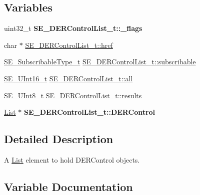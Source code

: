 \subsection*{Variables}
\begin{DoxyCompactItemize}
\item 
\mbox{\label{group__DERControlList_ga94515ccf4a77078fed1626de123ec5b2}} 
uint32\+\_\+t {\bfseries S\+E\+\_\+\+D\+E\+R\+Control\+List\+\_\+t\+::\+\_\+flags}
\item 
char $\ast$ \hyperlink{group__DERControlList_ga8ae02ab34efcdc073153919ae8ab74f5}{S\+E\+\_\+\+D\+E\+R\+Control\+List\+\_\+t\+::href}
\item 
\hyperlink{group__SubscribableType_ga5c41f553d369710ed34619266bf2551e}{S\+E\+\_\+\+Subscribable\+Type\+\_\+t} \hyperlink{group__DERControlList_ga870a4642c096dbebeffa0037894b9b41}{S\+E\+\_\+\+D\+E\+R\+Control\+List\+\_\+t\+::subscribable}
\item 
\hyperlink{group__UInt16_gac68d541f189538bfd30cfaa712d20d29}{S\+E\+\_\+\+U\+Int16\+\_\+t} \hyperlink{group__DERControlList_ga8f6118a4748b4550bf653a93d1586688}{S\+E\+\_\+\+D\+E\+R\+Control\+List\+\_\+t\+::all}
\item 
\hyperlink{group__UInt8_gaf7c365a1acfe204e3a67c16ed44572f5}{S\+E\+\_\+\+U\+Int8\+\_\+t} \hyperlink{group__DERControlList_gafeb66f551894913e0d3916884e8d506a}{S\+E\+\_\+\+D\+E\+R\+Control\+List\+\_\+t\+::results}
\item 
\mbox{\label{group__DERControlList_gaaf940c67b00730a46e3e03daf01d59ae}} 
\hyperlink{structList}{List} $\ast$ {\bfseries S\+E\+\_\+\+D\+E\+R\+Control\+List\+\_\+t\+::\+D\+E\+R\+Control}
\end{DoxyCompactItemize}


\subsection{Detailed Description}
A \hyperlink{structList}{List} element to hold D\+E\+R\+Control objects. 

\subsection{Variable Documentation}
\mbox{\label{group__DERControlList_ga8f6118a4748b4550bf653a93d1586688}} 
